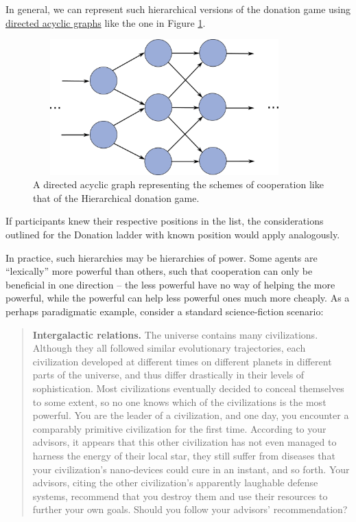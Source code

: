 In general, we can represent such hierarchical versions of the donation
game using
\href{https://en.wikipedia.org/wiki/Directed_acyclic_graph}{directed
acyclic graphs} like the one in Figure \ref{donation-DAG}.

\begin{figure}
    \centering
    \includegraphics[width=3.98958in,height=2.05728in]{figs/donation-DAG}
    \caption{A directed acyclic graph representing the schemes of cooperation like that of the
    Hierarchical donation game.}
    \label{donation-DAG}
\end{figure}

If participants knew their respective positions in the list, the
considerations outlined for the Donation ladder with known position
would apply analogously.

In practice, such hierarchies may be hierarchies of power. Some agents
are ``lexically'' more powerful than others, such that cooperation can
only be beneficial in one direction -- the less powerful have no way of
helping the more powerful, while the powerful can help less powerful
ones much more cheaply. As a perhaps paradigmatic example, consider a
standard science-fiction scenario:

\begin{quote}
\textbf{Intergalactic relations.} The universe contains many
civilizations. Although they all followed similar evolutionary
trajectories, each civilization developed at different times on
different planets in different parts of the universe, and thus differ
drastically in their levels of sophistication. Most civilizations
eventually decided to conceal themselves to some extent, so no one knows
which of the civilizations is the most powerful. You are the leader of a
civilization, and one day, you encounter a comparably primitive
civilization for the first time. According to your advisors, it appears
that this other civilization has not even managed to harness the energy
of their local star, they still suffer from diseases that your
civilization's nano-devices could cure in an instant, and so forth. Your
advisors, citing the other civilization's apparently laughable defense
systems, recommend that you destroy them and use their resources to
further your own goals. Should you follow your advisors' recommendation?
\end{quote}


